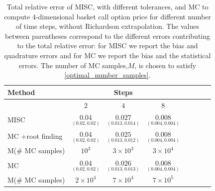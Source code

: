 \FloatBarrier
\begin{table}[h!]
	\centering
	\begin{tabular}{l*{6}{c}r}
		\toprule[1.5pt]
	Method & & Steps  & &     \\
	\hline
           & $2$ & $4$ & $8$   \\
		\hline
		MISC   &  $\underset{(0.02,0.02)}{\mathbf{0.04}}$ & $\underset{(0.013,0.014)}{\mathbf{0.027}}$ & $\underset{(0.004,0.004)}{\mathbf{0.008}}$   \\

		\hline		
			MC +root finding   &  $\underset{(0.02,0.02)}{\mathbf{0.04}}$ & $\underset{(0.013,0.012)}{\mathbf{0.025}}$ & $\underset{(0.004,0.004)}{\mathbf{0.008}}$  \\
			M(\# MC samples)   & $10^3$   &  $3 \times 10^3$ &  $3 \times 10^4$  \\	
		\hline	
				MC   &  $\underset{(0.02,0.02)}{\mathbf{0.04}}$ & $\underset{(0.013,0.013)}{\mathbf{0.026}}$ & $\underset{(0.004,0.004)}{\mathbf{0.008}}$   \\	
				M(\# MC samples)   &$2 \times 10^4$  & $7 \times 10^4 $  &  $7 \times 10^5 $ \\	
		
			\bottomrule[1.25pt]
	\end{tabular}
	\caption{Total relative  error of MISC, with different tolerances, and MC to compute $4$-dimensional basket call option price for different number of time steps, without Richardson extrapolation. The values between parentheses correspond to the different errors contributing to the total relative error: for MISC we report the bias and quadrature errors and for MC we report the bias and the statistical errors. The number of MC samples,$ M$, is chosen to satisfy \eqref{optimal_number_samples}.}
	\label{Total error of MISC and MC to compute 4 dim basket  Call option price of the different tolerances for different number of time steps, without Richardson extrapolation. The numbers between parentheses are the corresponding absolute errors.}
\end{table}
\FloatBarrier




